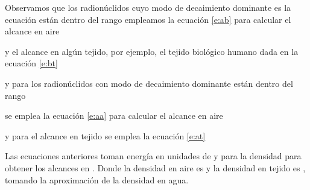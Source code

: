 Observamos que los radionúclidos cuyo modo de decaimiento dominante es la ecuación \ec{\beta} están dentro del rango 
empleamos la ecuación \ref{e:ab} para calcular el alcance en aire


y el alcance en algún tejido, por ejemplo, el tejido biológico humano  dada en la ecuación \ref{e:bt}



y para los radionúclidos con modo de decaimiento dominante \ec{\alpha} están dentro del rango 

se emplea la ecuación \ref{e:aa} para calcular el alcance en aire

y para el alcance en tejido se emplea la ecuación \ref{e:at}


Las ecuaciones anteriores toman energía en unidades de \ec{[MeV]} y para la densidad \ec{[mg/cm^3]} para obtener los alcances en \ec{[cm]}. Donde la densidad en aire es  y la densidad en tejido es , tomando la aproximación de la densidad en agua.



